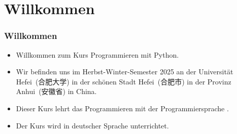\documentclass[aspectratio=169,mathserif,notheorems]{beamer}%
\subtitle{1.~Organisation}%
\begin{document}
%
%
\startPresentation%
%
\section{Willkommen}%
%
\begin{frame}[t]%
\frametitle{Willkommen}%
\begin{itemize}%
%
\item Willkommen zum Kurs \alert{Programmieren mit Python}.%
%
\item<2-> Wir befinden uns im Herbst-Winter-Semester 2025 an der Universität Hefei~(合肥大学) in der schönen Stadt Hefei~(合肥市) in der Provinz Anhui~(安徽省) in China.%
%
\item<3-> Dieser Kurs lehrt das Programmieren mit der Programmiersprache \python.%
%
\item<4-> Der Kurs wird in deutscher Sprache unterrichtet.%
%
\end{itemize}%
\end{frame}%
%
\end{document}
